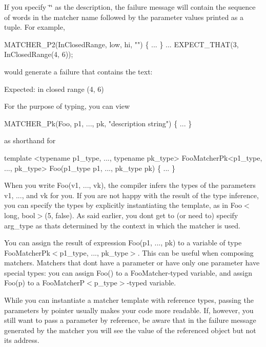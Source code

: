 If you specify {\ttfamily \char`\"{}\char`\"{}} as the description, the failure message will contain the sequence of words in the matcher name followed by the parameter values printed as a tuple. For example, 
\begin{DoxyCode}
MATCHER\_P2(InClosedRange, low, hi, "") \{ ... \}
...
EXPECT\_THAT(3, InClosedRange(4, 6));
\end{DoxyCode}
 would generate a failure that contains the text\+: 
\begin{DoxyCode}
Expected: in closed range (4, 6)
\end{DoxyCode}


For the purpose of typing, you can view 
\begin{DoxyCode}
MATCHER\_Pk(Foo, p1, ..., pk, "description string") \{ ... \}
\end{DoxyCode}
 as shorthand for 
\begin{DoxyCode}
template <typename p1\_type, ..., typename pk\_type>
FooMatcherPk<p1\_type, ..., pk\_type>
Foo(p1\_type p1, ..., pk\_type pk) \{ ... \}
\end{DoxyCode}


When you write {\ttfamily Foo(v1, ..., vk)}, the compiler infers the types of the parameters {\ttfamily v1}, ..., and {\ttfamily vk} for you. If you are not happy with the result of the type inference, you can specify the types by explicitly instantiating the template, as in {\ttfamily Foo$<$long, bool$>$(5, false)}. As said earlier, you don\textquotesingle{}t get to (or need to) specify {\ttfamily arg\+\_\+type} as that\textquotesingle{}s determined by the context in which the matcher is used.

You can assign the result of expression {\ttfamily Foo(p1, ..., pk)} to a variable of type {\ttfamily Foo\+Matcher\+Pk$<$p1\+\_\+type, ..., pk\+\_\+type$>$}. This can be useful when composing matchers. Matchers that don\textquotesingle{}t have a parameter or have only one parameter have special types\+: you can assign {\ttfamily Foo()} to a {\ttfamily Foo\+Matcher}-\/typed variable, and assign {\ttfamily Foo(p)} to a {\ttfamily Foo\+MatcherP$<$p\+\_\+type$>$}-\/typed variable.

While you can instantiate a matcher template with reference types, passing the parameters by pointer usually makes your code more readable. If, however, you still want to pass a parameter by reference, be aware that in the failure message generated by the matcher you will see the value of the referenced object but not its address.

